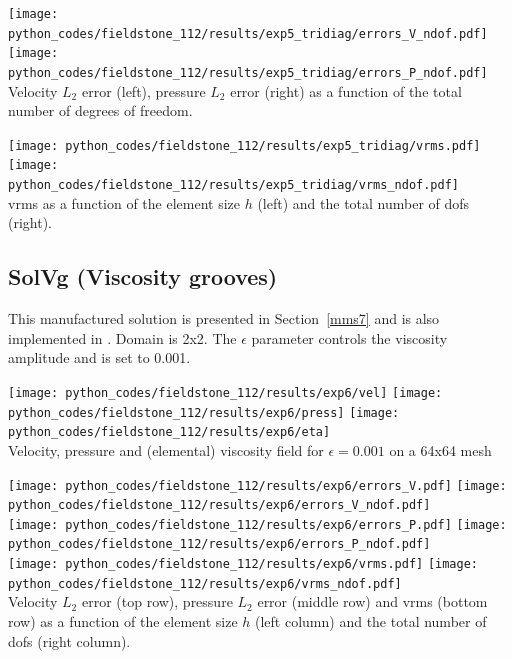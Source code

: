 \begin{center}
\texttt{[image: python\_codes/fieldstone\_112/results/exp5\_tridiag/errors\_V\_ndof.pdf]}
\texttt{[image: python\_codes/fieldstone\_112/results/exp5\_tridiag/errors\_P\_ndof.pdf]}\\
{\captionfont Velocity $L_2$ error (left), pressure $L_2$ error (right) as a function of the total 
number of degrees of freedom.} 
\end{center}


\begin{center}
\texttt{[image: python\_codes/fieldstone\_112/results/exp5\_tridiag/vrms.pdf]}
\texttt{[image: python\_codes/fieldstone\_112/results/exp5\_tridiag/vrms\_ndof.pdf]}\\
{\captionfont vrms as a function of the element size $h$ (left) and the total number of dofs (right).}
\end{center}


\newpage
\subsection*{SolVg (Viscosity grooves)}

This manufactured solution is presented in Section~\ref{mms7} and is also implemented in \aspect.
Domain is 2x2. The $\epsilon$ parameter controls the viscosity amplitude and is set to 0.001.

\begin{center}
\texttt{[image: python\_codes/fieldstone\_112/results/exp6/vel]}
\texttt{[image: python\_codes/fieldstone\_112/results/exp6/press]}
\texttt{[image: python\_codes/fieldstone\_112/results/exp6/eta]}\\
{\captionfont Velocity, pressure and (elemental) viscosity field for $\epsilon=0.001$ on a 64x64 mesh}
\end{center}


\begin{center}
\texttt{[image: python\_codes/fieldstone\_112/results/exp6/errors\_V.pdf]}
\texttt{[image: python\_codes/fieldstone\_112/results/exp6/errors\_V\_ndof.pdf]}\\
\texttt{[image: python\_codes/fieldstone\_112/results/exp6/errors\_P.pdf]}
\texttt{[image: python\_codes/fieldstone\_112/results/exp6/errors\_P\_ndof.pdf]}\\
\texttt{[image: python\_codes/fieldstone\_112/results/exp6/vrms.pdf]}
\texttt{[image: python\_codes/fieldstone\_112/results/exp6/vrms\_ndof.pdf]}\\
{\captionfont Velocity $L_2$ error (top row), pressure $L_2$ error (middle row) and vrms (bottom row) 
as a function of the element size $h$ (left column) and the total number of dofs (right column).}
\end{center}






